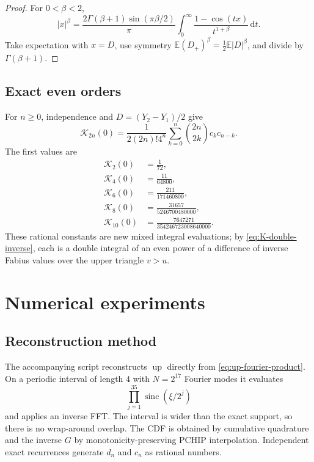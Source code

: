 \documentclass[11pt,oneside]{article}
\theoremstyle{definition}
\theoremstyle{remark}
\newcommand{\E}{\mathbb E}
\newcommand{\Up}{\operatorname{up}}
\newcommand{\sinc}{\operatorname{sinc}}
\newcommand{\dd}{\,\mathrm d}
\newcommand{\pathcode}[1]{\texttt{\detokenize{#1}}}
\newcommand{\Kord}{\mathcal K}
\begin{document}
\begin{proof}
For $0<\beta<2$,
\begin{equation}
 |x|^\beta
 =\frac{2\Gamma(\beta+1)\sin(\pi\beta/2)}\pi
  \int_0^\infty\frac{1-\cos(tx)}{t^{1+\beta}}\dd t.
\end{equation}
Take expectation with $x=D$, use symmetry
$\E(D_+)^\beta=\frac12\E|D|^\beta$, and divide by
$\Gamma(\beta+1)$.
\end{proof}

\subsection{Exact even orders}

For $n\ge0$, independence and $D=(Y_2-Y_1)/2$ give
\begin{equation}
 \Kord_{2n}(0)
 =\frac{1}{2(2n)!4^n}
  \sum_{k=0}^{n}\binom{2n}{2k}c_kc_{n-k}.
 \label{eq:K-even-exact}
\end{equation}
The first values are
\begin{align}
 \Kord_2(0)&=\frac1{72},\\
 \Kord_4(0)&=\frac{11}{64800},\\
 \Kord_6(0)&=\frac{211}{171460800},\\
 \Kord_8(0)&=\frac{31657}{5246700480000},\\
 \Kord_{10}(0)&=\frac{7647271}{354246723008640000}.
 \label{eq:K-even-first-values}
\end{align}
These rational constants are new mixed integral evaluations; by
\eqref{eq:K-double-inverse}, each is a double integral of an even power of a
difference of inverse Fabius values over the upper triangle $v>u$.

\section{Numerical experiments}
\label{sec:numerics}

\subsection{Reconstruction method}

The accompanying script \pathcode{numerical_experiments.py} reconstructs
$\Up$ directly from \eqref{eq:up-fourier-product}.  On a periodic interval of
length $4$ with $N=2^{17}$ Fourier modes it evaluates
\begin{equation}
 \prod_{j=1}^{35}\sinc(\xi/2^j)
\end{equation}
and applies an inverse FFT.  The interval is wider than the exact support, so
there is no wrap-around overlap.  The CDF is obtained by cumulative
quadrature and the inverse $G$ by monotonicity-preserving PCHIP interpolation.
Independent exact recurrences generate $d_n$ and $c_n$ as rational numbers.
\end{document}
